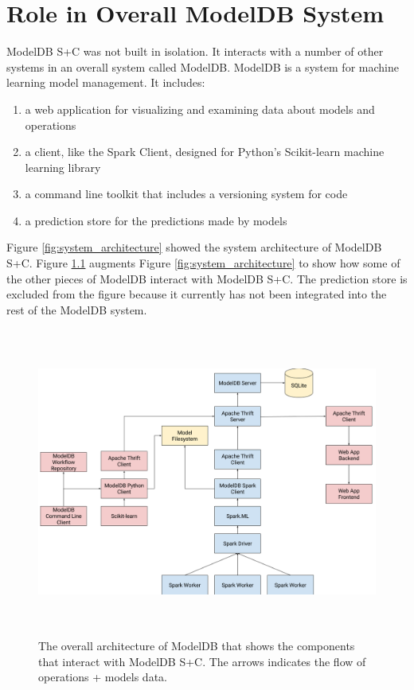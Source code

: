 \chapter{Role in Overall ModelDB System}
ModelDB S+C was not built in isolation. It interacts with a number of other
systems in an overall system called ModelDB. ModelDB is a system for machine learning
model management. It includes:

\begin{enumerate}
\item a web application for visualizing and examining data about models and operations
\item a client, like the Spark Client, designed for Python's Scikit-learn machine learning
library
\item a command line toolkit that includes a versioning system for code
\item a prediction store for the predictions made by models
\end{enumerate}

Figure \ref{fig:system_architecture} showed the system architecture
of ModelDB S+C. Figure \ref{fig:full_system_architecture} augments Figure \ref{fig:system_architecture}
to show how some of the other pieces of ModelDB interact with ModelDB S+C. The prediction store
is excluded from the figure because it currently has not been integrated into the rest of the ModelDB
system.

\begin{figure}
  \centering
  \includegraphics[height=4.0in]{full_system_architecture}
  \caption{
    The overall architecture of ModelDB that shows the components
    that interact with ModelDB S+C. The arrows indicates the flow
    of operations + models data. 
  }
  \label{fig:full_system_architecture}
\end{figure}


